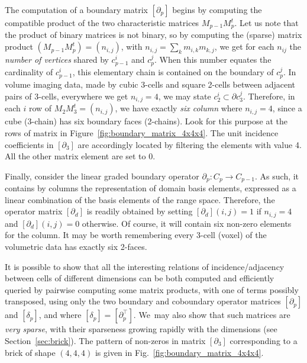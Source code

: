 The computation of a boundary matrix $[\partial_p]$ begins by computing the compatible product of the two characteristic matrices $M_{p-1}M_{p}^t$.
Let us note that the product of binary matrices is not binary, so by computing the (sparse) matrix product $(M_{p-1} M_{p}^t) = (n_{i,j})$, with $n_{i,j} = \sum_{k} m_{i,k}m_{k,j}$, we get for each $n_{ij}$ the \emph{number of vertices} shared by $c_{p-1}^i$ and $c_{p}^j$. When this number equates the cardinality of $c_{p-1}^i$, this elementary chain is contained on the boundary of $c_{p}^j$. In volume imaging data, made by cubic 3-cells and square 2-cells between adjacent pairs of 3-cells, everywhere we get  $n_{i,j}=4$, we may state $c_{2}^i\subset\partial c_{3}^j$. 
Therefore, in each $i$ row of $M_{2} M_{3}^t = (n_{i,j})$, we have exactly \emph{six column} where  $n_{i,j} = 4$, since a cube (3-chain) has six boundary faces (2-chains). Look for this purpose at the rows of matrix in Figure~\ref{fig:boundary_matrix_4x4x4}.
The unit incidence coefficients in $\left[\partial_3\right]$ are accordingly located by filtering the elements with value 4. All the other matrix element are set to 0. 

Finally, consider the linear graded boundary operator $\partial_p : C_p \to C_{p-1}$. As such, it contains by columns the representation of domain basis elements, expressed as a linear combination of the basis elements of the range space. Therefore, the operator matrix $[\partial_d]$ is readily obtained by setting $[\partial_d](i,j)=1$ if $n_{i,j}=4$ and $[\partial_d](i,j)=0$ otherwise.  Of course, it will contain six non-zero elements for the column.  It may be worth remembering every 3-cell (voxel) of the volumetric data has exactly six 2-faces. 

It is possible to show that all the interesting relations of incidence/adjacency between cells of different dimensions can be both computed and efficiently queried by pairwise computing some matrix products, with one of terms possibly transposed, using only the two boundary and coboundary operator matrices $[\partial_p]$ and $[\delta_p]$, and where $[\delta_p] = [\partial_p^\top]$. We~may also show that such matrices are \emph{very sparse}, with their sparseness growing rapidly with the dimensions (see Section~\ref{sec:brick}). The pattern of non-zeros in matrix $[\partial_3]$ corresponding to a brick of shape $(4,4,4)$ is given in Fig.~\ref{fig:boundary_matrix_4x4x4}.

